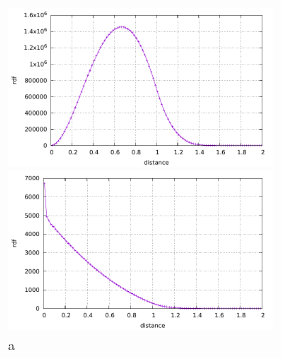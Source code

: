 \begin{center}
\includegraphics[width=7cm]{python_codes/fieldstone_125/results/rdf/rdf}
\includegraphics[width=7cm]{python_codes/fieldstone_125/results/rdf/rdf_normalised}\\
{\captionfont a }
\end{center}
 


















